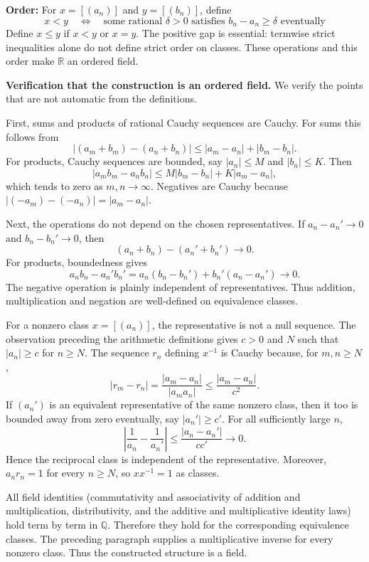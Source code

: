 \documentclass[a4paper,11pt,abstracton]{scrartcl}
\newcommand{\RR}{\mathbb{R}}
\newcommand{\QQ}{\mathbb{Q}}
\theoremstyle{dotlessP}
\theoremstyle{dotlessS}
\theoremstyle{remark}
\theoremstyle{definition}
\begin{document}
\begin{claim_box}
\textbf{Order:} For $x=[(a_n)]$ and $y=[(b_n)]$, define
\[
    x<y\quad\Longleftrightarrow\quad
    \text{some rational }\delta>0\text{ satisfies }
    b_n-a_n\ge\delta\text{ eventually}
\]
Define $x\le y$ if $x<y$ or $x=y$. The positive gap is essential:
termwise strict inequalities alone do not define strict order on classes.
These operations and this order make $\RR$ an ordered field.
\end{claim_box}

\begin{claim_box}
\textbf{Verification that the construction is an ordered field.}
We verify the points that are not automatic from the definitions.

First, sums and products of rational Cauchy sequences are Cauchy.
For sums this follows from
\[
 |(a_m+b_m)-(a_n+b_n)|\le|a_m-a_n|+|b_m-b_n|.
\]
For products, Cauchy sequences are bounded, say
$|a_n|\le M$ and $|b_n|\le K$. Then
\[
 |a_mb_m-a_nb_n|
 \le M|b_m-b_n|+K|a_m-a_n|,
\]
which tends to zero as $m,n\to\infty$. Negatives are Cauchy because
$|(-a_m)-(-a_n)|=|a_m-a_n|$.

Next, the operations do not depend on the chosen representatives.
If $a_n-a_n'\to0$ and $b_n-b_n'\to0$, then
\[
 (a_n+b_n)-(a_n'+b_n')\to0.
\]
For products, boundedness gives
\[
 a_nb_n-a_n'b_n'
 =a_n(b_n-b_n')+b_n'(a_n-a_n')\to0.
\]
The negative operation is plainly independent of representatives.
Thus addition, multiplication and negation are well-defined on
 equivalence classes.

For a nonzero class $x=[(a_n)]$, the representative is not a null
sequence. The observation preceding the arithmetic definitions gives
$c>0$ and $N$ such that $|a_n|\ge c$ for $n\ge N$. The sequence
$r_n$ defining $x^{-1}$ is Cauchy because, for $m,n\ge N$,
\[
 |r_m-r_n|=\frac{|a_m-a_n|}{|a_ma_n|}
 \le\frac{|a_m-a_n|}{c^2}.
\]
If $(a_n')$ is an equivalent representative of the same nonzero
class, then it too is bounded away from zero eventually, say
$|a_n'|\ge c'$. For all sufficiently large $n$,
\[
 \left|\frac1{a_n}-\frac1{a_n'}\right|
 \le\frac{|a_n-a_n'|}{cc'}\longrightarrow0.
\]
Hence the reciprocal class is independent of the representative.
Moreover, $a_nr_n=1$ for every $n\ge N$, so $xx^{-1}=1$ as
classes.

All field identities (commutativity and associativity of addition
and multiplication, distributivity, and the additive and
multiplicative identity laws) hold term by term in $\QQ$. Therefore
they hold for the corresponding equivalence classes. The preceding
paragraph supplies a multiplicative inverse for every nonzero class.
Thus the constructed structure is a field.


\end{claim_box}
\end{document}
